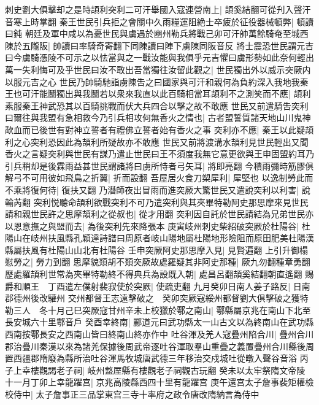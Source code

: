 刺史劉大俱擊却之是時頡利突利二可汗舉國入寇連營南上|{
	頡奚結翻可從刋入聲汗音寒上時掌翻}
秦王世民引兵拒之會關中久雨糧運阻絶士卒疲於征役器械頓弊|{
	頓讀曰鈍}
朝廷及軍中咸以為憂世民與虜遇於豳州勒兵將戰己卯可汗帥萬餘騎奄至城西陳於五隴阪|{
	帥讀曰率騎奇寄翻下同陳讀曰陣下虜陳同阪音反}
將士震恐世民謂元吉曰今虜騎憑陵不可示之以怯當與之一戰汝能與我俱乎元吉懼曰虜形勢如此奈何輕出萬一失利悔可及乎世民曰汝不敢出吾當獨往汝留此觀之|{
	世民獨出外以威示突厥内以服元吉之心}
世民乃帥騎馳詣虜陳吿之曰國家與可汗和親何為負約深入我地我秦王也可汗能鬭獨出與我鬭若以衆來我直以此百騎相當耳頡利不之測笑而不應|{
	頡利素服秦王神武恐其以百騎挑戰而伏大兵四合以擊之故不敢應}
世民又前遣騎吿突利曰爾往與我盟有急相救今乃引兵相攻何無香火之情也|{
	古者盟誓質諸天地山川鬼神歃血而已後世有對神立誓者有禮佛立誓者始有香火之事}
突利亦不應|{
	秦王以此疑頡利之心突利恐因此為頡利所疑故亦不敢應}
世民又前將渡溝水頡利見世民輕出又聞香火之言疑突利與世民有謀乃遣止世民曰王不須度我無它意更欲與王申固盟約耳乃引兵稍却是後霖雨益甚世民謂諸將曰虜所恃者弓矢耳|{
	將即亮翻}
今積雨彌時筋膠俱解弓不可用彼如飛鳥之折翼|{
	折而設翻}
吾屋居火食刀槊犀利|{
	犀堅也}
以逸制勞此而不乘將復何待|{
	復扶又翻}
乃潛師夜出冒雨而進突厥大驚世民又遣說突利以利害|{
	說輸芮翻}
突利悦聽命頡利欲戰突利不可乃遣突利與其夾畢特勒阿史那思摩來見世民請和親世民許之思摩頡利之從叔也|{
	從才用翻}
突利因自託於世民請結為兄弟世民亦以恩意撫之與盟而去|{
	為後突利先來降張本}
庚寅岐州刺史柴紹破突厥於杜陽谷|{
	杜陽山在岐州扶風縣孔穎達詩譜曰周原者岐山陽地屬杜陽地形險阻而原田肥美杜陽漢縣屬扶風有杜陽山山北有杜陽谷}
壬申突厥阿史那思摩入見|{
	見賢遍翻}
上引升御榻慰勞之|{
	勞力到翻}
思摩貌類胡不類突厥故處羅疑其非阿史那種|{
	厥九勿翻種章勇翻}
歷處羅頡利世常為夾畢特勒終不得典兵為設既入朝|{
	處昌呂翻頡奚結翻朝直遙翻}
賜爵和順王　丁酉遣左僕射裴寂使於突厥|{
	使疏吏翻}
九月癸卯日南人姜子路反|{
	日南郡德州後改驩州}
交州都督王志遠擊破之　癸卯突厥寇綏州都督劉大俱擊破之獲特勒三人　冬十月己巳突厥寇甘州辛未上校獵於鄠之南山|{
	鄠縣屬京兆在南山下北至長安城六十里鄠音戶}
癸酉幸終南|{
	酈道元曰武功縣太一山古文以為終南山在武功縣西南按鄠長安之西南山皆曰終南山終亦作中}
吐谷渾及羌人寇疊州陷合川|{
	疊州合川郡治疊川秦漢以來為諸羌保據後周武帝逐吐谷渾取羣山重疊之義置疊州合川縣後周置西疆郡隋廢為縣所治吐谷渾馬牧城唐武德三年移治交戍城吐從暾入聲谷音浴}
丙子上幸樓觀謁老子祠|{
	岐州盩厔縣有樓觀老子祠觀古玩翻}
癸未以太牢祭隋文帝陵　十一月丁卯上幸龍躍宫|{
	京兆高陵縣西四十里有龍躍宫}
庚午還宫太子詹事裴矩權檢校侍中|{
	太子詹事正三品掌東宫三寺十率府之政令唐改隋納言為侍中}


